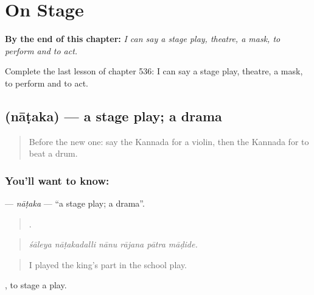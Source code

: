 
\chapter{On Stage}
\label{ch:ka-on-stage}

\begin{chapteropening}
\textbf{By the end of this chapter:} \emph{I can say a stage play, theatre, a mask, to perform and to act.}

Complete the last lesson of chapter 536: I can say a stage play, theatre, a mask, to perform and to act.
\end{chapteropening}

\section[\texorpdfstring{\kn{ನಾಟಕ} (nāṭaka)}{ನಾಟಕ (nāṭaka)}]{ (nāṭaka) — a stage play; a drama}

\label{lesson:KA-C536-nataka}



\begin{quote}
Before the new one: say the Kannada for a violin, then the Kannada for to beat a drum.
\end{quote}

\subsection*{You'll want to know: }
\textbf{} — \emph{nāṭaka} — \textquotedblleft{}a stage play; a drama\textquotedblright{}.

\begin{quote}
     .
\end{quote}

\begin{quote}
\emph{śāleya nāṭakadalli nānu rājana pātra māḍide.}
\end{quote}

\begin{quote}
I played the king's part in the school play.
\end{quote}

 , to stage a play.


